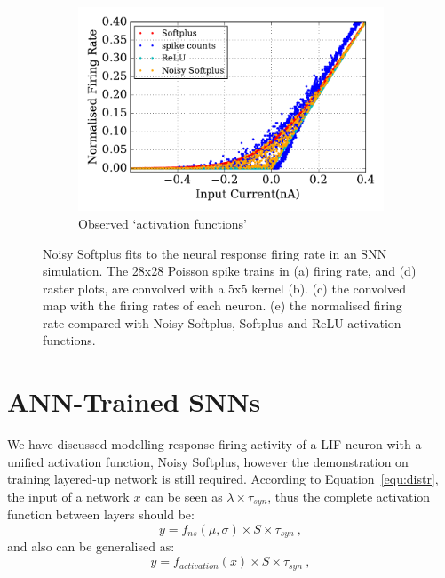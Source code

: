 \begin{figure}[bt!]
		\begin{subfigure}[t]{0.7\textwidth}
			\includegraphics[width=\textwidth]{pics_iconip/6-5.pdf}
		    \caption{Observed `activation functions'}
		    \label{Fig:65}
		\end{subfigure}
		\caption{
			Noisy Softplus fits to the neural response firing rate in an SNN simulation.
			The 28x28 Poisson spike trains in (a) firing rate, and (d) raster plots, are convolved with a 5x5 kernel (b).
			(c) the convolved map with the firing rates of each neuron.
			(e) the normalised firing rate compared with Noisy Softplus, Softplus and ReLU activation functions.}
		\label{fig:cnn}
	\end{figure}
	
\section{ANN-Trained SNNs}	
	We have discussed modelling response firing activity of a LIF neuron with a unified activation function, Noisy Softplus, however the demonstration on training layered-up network is still required.
	According to Equation~\ref{equ:distr}, the input of a network $x$ can be seen as $\lambda  \times \tau_{syn}$, thus the complete activation function between layers should be:
	\begin{equation}
	y = f_{ns}(\mu, \sigma) \times S \times \tau_{syn}~,
	\end{equation}
	and also can be generalised as:
	\begin{equation}
	y = f_{activation}(x) \times S \times \tau_{syn}~,
	\end{equation}


